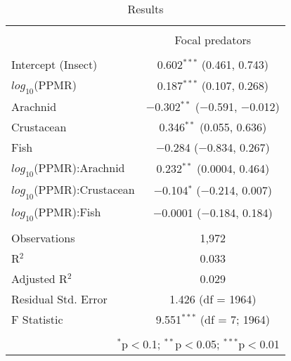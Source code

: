 
\begin{table}[!htbp] \centering 
  \caption{Results} 
  \label{tab:n-ppmr_byPreds} 
\begin{tabular}{@{\extracolsep{5pt}}lc} 
\\[-1.8ex]\hline 
\hline \\[-1.8ex] 
 & \multicolumn{1}{c}{Focal predators} \\ 
\cline{2-2} 
\hline \\[-1.8ex] 
 Intercept (Insect) & 0.602$^{***}$ (0.461, 0.743) \\ 
  $log_{10}$(PPMR) & 0.187$^{***}$ (0.107, 0.268) \\ 
  Arachnid & $-$0.302$^{**}$ ($-$0.591, $-$0.012) \\ 
  Crustacean & 0.346$^{**}$ (0.055, 0.636) \\ 
  Fish & $-$0.284 ($-$0.834, 0.267) \\ 
  $log_{10}$(PPMR):Arachnid & 0.232$^{**}$ (0.0004, 0.464) \\ 
  $log_{10}$(PPMR):Crustacean & $-$0.104$^{*}$ ($-$0.214, 0.007) \\ 
  $log_{10}$(PPMR):Fish & $-$0.0001 ($-$0.184, 0.184) \\ 
 \hline \\[-1.8ex] 
Observations & 1,972 \\ 
R$^{2}$ & 0.033 \\ 
Adjusted R$^{2}$ & 0.029 \\ 
Residual Std. Error & 1.426 (df = 1964) \\ 
F Statistic & 9.551$^{***}$ (df = 7; 1964) \\ 
\hline 
\hline \\[-1.8ex] 
\multicolumn{2}{r}{$^{*}$p$<$0.1; $^{**}$p$<$0.05; $^{***}$p$<$0.01} \\ 
\end{tabular} 
\end{table} 
